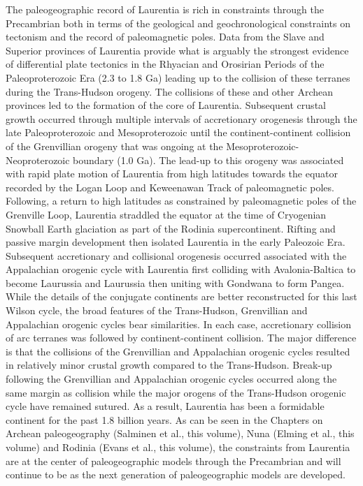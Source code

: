 \documentclass[11pt,letterpaper]{article}
\begin{document}
The paleogeographic record of Laurentia is rich in constraints through the Precambrian both in terms of the geological and geochronological constraints on tectonism and the record of paleomagnetic poles. Data from the Slave and Superior provinces of Laurentia provide what is arguably the strongest evidence of differential plate tectonics in the Rhyacian and Orosirian Periods of the Paleoproterozoic Era (2.3 to 1.8 Ga) leading up to the collision of these terranes during the Trans-Hudson orogeny. The collisions of these and other Archean provinces led to the formation of the core of Laurentia. Subsequent crustal growth occurred through multiple intervals of accretionary orogenesis through the late Paleoproterozoic and Mesoproterozoic until the continent-continent collision of the Grenvillian orogeny that was ongoing at the Mesoproterozoic-Neoproterozoic boundary (1.0 Ga). The lead-up to this orogeny was associated with rapid plate motion of Laurentia from high latitudes towards the equator recorded by the Logan Loop and Keweenawan Track of paleomagnetic poles. Following, a return to high latitudes as constrained by paleomagnetic poles of the Grenville Loop, Laurentia straddled the equator at the time of Cryogenian Snowball Earth glaciation as part of the Rodinia supercontinent. Rifting and passive margin development then isolated Laurentia in the early Paleozoic Era. Subsequent accretionary and collisional orogenesis occurred associated with the Appalachian orogenic cycle with Laurentia first colliding with Avalonia-Baltica to become Laurussia and Laurussia then uniting with Gondwana to form Pangea. While the details of the conjugate continents are better reconstructed for this last Wilson cycle, the broad features of the Trans-Hudson, Grenvillian and Appalachian orogenic cycles bear similarities. In each case, accretionary collision of arc terranes was followed by continent-continent collision. The major difference is that the collisions of the Grenvillian and Appalachian orogenic cycles resulted in relatively minor crustal growth compared to the Trans-Hudson. Break-up following the Grenvillian and Appalachian orogenic cycles occurred along the same margin as collision while the major orogens of the Trans-Hudson orogenic cycle have remained sutured. As a result, Laurentia has been a formidable continent for the past 1.8 billion years. As can be seen in the Chapters on Archean paleogeography (Salminen et al., this volume), Nuna (Elming et al., this volume) and Rodinia (Evans et al., this volume), the constraints from Laurentia are at the center of paleogeographic models through the Precambrian and will continue to be as the next generation of paleogeographic models are developed.
\end{document}
